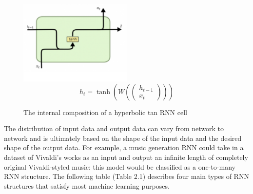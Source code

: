 \begin{figure}[th]
    \centering
    \includegraphics[width=0.5\textwidth]{Figures/rnnarch.png}
    \[ h_t = \tanh(W(
        \begin{pmatrix}
            h_{t-1} \\ x_t
        \end{pmatrix}
    )) \]
    \decoRule
    \caption[RNN Cell]{The internal composition of a hyperbolic tan RNN cell}
    \label{fig:RNNCell}
\end{figure}

The distribution of input data and output data can vary from network to network and is ultimately based on the shape of the input data and the desired shape of the output data. For example, a music generation RNN could take in a dataset of Vivaldi’s works as an input and output an infinite length of completely original Vivaldi-styled music: this model would be classified as a one-to-many RNN structure. The following table (Table 2.1) describes four main types of RNN structures that satisfy most machine learning purposes.

